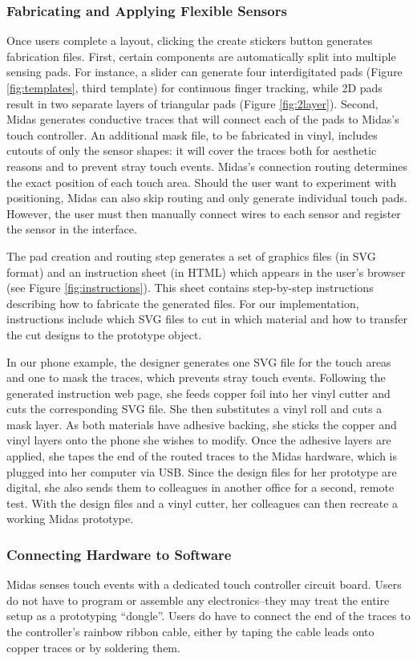 \subsubsection{Fabricating and Applying Flexible Sensors}
Once users complete a layout, clicking the create stickers
button generates fabrication files. First, certain components
are automatically split into multiple sensing pads. For instance,
a slider can generate four interdigitated pads (Figure \ref{fig:templates}, third template) for continuous finger tracking, while
2D pads result in two separate layers of triangular pads (Figure
\ref{fig:2layer}). Second, Midas generates conductive traces that will
connect each of the pads to Midas’s touch controller. An additional mask file, to be fabricated in vinyl, includes cutouts
of only the sensor shapes: it will cover the traces both for aesthetic
reasons and to prevent stray touch events. Midas’s connection
routing determines the exact position of each touch
area. Should the user want to experiment with positioning,
Midas can also skip routing and only generate individual
touch pads. However, the user must then manually connect
wires to each sensor and register the sensor in the interface.

The pad creation and routing step generates a set of graphics
files (in SVG format) and an instruction sheet (in HTML)
which appears in the user’s browser (see Figure \ref{fig:instructions}). This sheet
contains step-by-step instructions describing how to fabricate
the generated files. For our implementation, instructions include
which SVG files to cut in which material and how to
transfer the cut designs to the prototype object.

In our phone example, the designer generates one SVG file
for the touch areas and one to mask the traces, which prevents
stray touch events. Following the generated instruction
web page, she feeds copper foil into her vinyl cutter and cuts
the corresponding SVG file. She then substitutes a vinyl roll
and cuts a mask layer. As both materials have adhesive backing,
she sticks the copper and vinyl layers onto the phone
she wishes to modify. Once the adhesive layers are applied,
she tapes the end of the routed traces to the Midas hardware,
which is plugged into her computer via USB. Since the design
files for her prototype are digital, she also sends them to
colleagues in another office for a second, remote test. With
the design files and a vinyl cutter, her colleagues can then
recreate a working Midas prototype.

\subsubsection{Connecting Hardware to Software}
Midas senses touch events with a dedicated touch controller
circuit board. Users do not have to program or assemble any
electronics--they may treat the entire setup as a prototyping
“dongle”. Users do have to connect the end of the traces to
the controller’s rainbow ribbon cable, either by taping the
cable leads onto copper traces or by soldering them.

